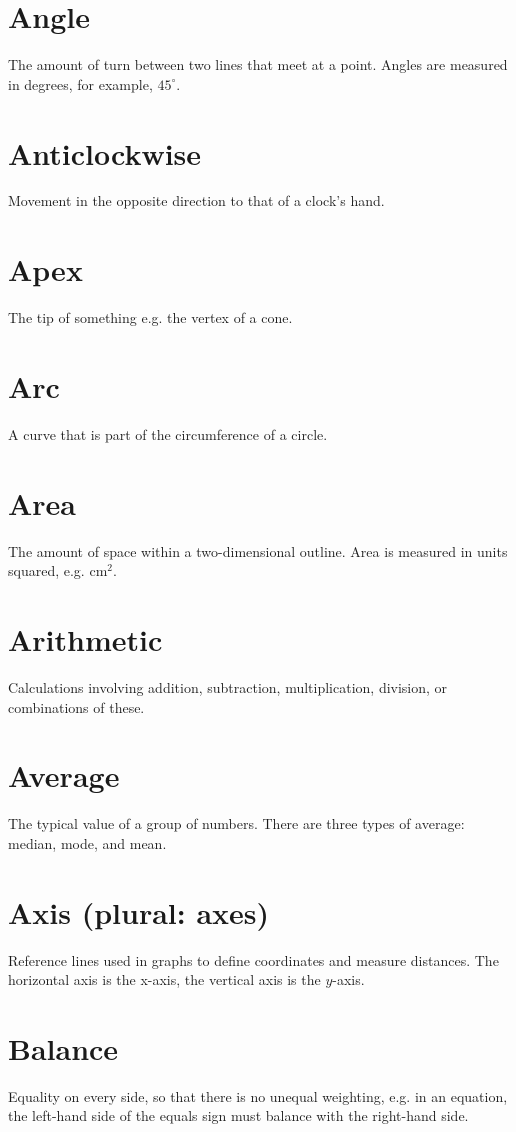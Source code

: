 \documentclass[10pt]{article}
\begin{document}
\section*{Angle}
The amount of turn between two lines that meet at a point. Angles are measured in degrees, for example, $45^{\circ}$.

\section*{Anticlockwise}
Movement in the opposite direction to that of a clock's hand.

\section*{Apex}
The tip of something e.g. the vertex of a cone.

\section*{Arc}
A curve that is part of the circumference of a circle.

\section*{Area}
The amount of space within a two-dimensional outline. Area is measured in units squared, e.g. $\mathrm{cm}^{2}$.

\section*{Arithmetic}
Calculations involving addition, subtraction, multiplication, division, or combinations of these.

\section*{Average}
The typical value of a group of numbers. There are three types of average: median, mode, and mean.

\section*{Axis (plural: axes)}
Reference lines used in graphs to define coordinates and measure distances. The horizontal axis is the x-axis, the vertical axis is the $y$-axis.

\section*{Balance}
Equality on every side, so that there is no unequal weighting, e.g. in an equation, the left-hand side of the equals sign must balance with the right-hand side.
\end{document}
